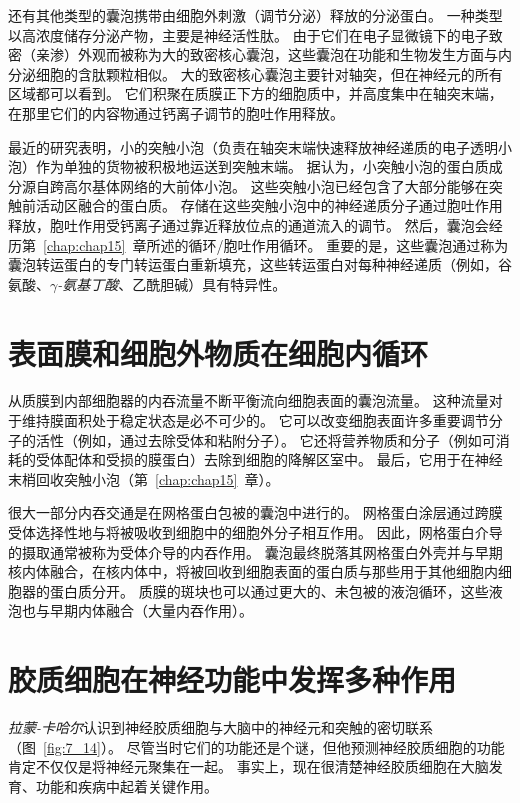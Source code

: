还有其他类型的囊泡携带由细胞外刺激（调节分泌）释放的分泌蛋白。
一种类型以高浓度储存分泌产物，主要是神经活性肽。
由于它们在电子显微镜下的电子致密（亲渗）外观而被称为大的致密核心囊泡，这些囊泡在功能和生物发生方面与内分泌细胞的含肽颗粒相似。
大的致密核心囊泡主要针对轴突，但在神经元的所有区域都可以看到。
它们积聚在质膜正下方的细胞质中，并高度集中在轴突末端，在那里它们的内容物通过钙离子调节的胞吐作用释放。


最近的研究表明，小的突触小泡（负责在轴突末端快速释放神经递质的电子透明小泡）作为单独的货物被积极地运送到突触末端。
据认为，小突触小泡的蛋白质成分源自跨高尔基体网络的大前体小泡。
这些突触小泡已经包含了大部分能够在突触前活动区融合的蛋白质。
存储在这些突触小泡中的神经递质分子通过胞吐作用释放，胞吐作用受钙离子通过靠近释放位点的通道流入的调节。
然后，囊泡会经历第~\ref{chap:chap15}~章所述的循环/胞吐作用循环。
重要的是，这些囊泡通过称为囊泡转运蛋白的专门转运蛋白重新填充，这些转运蛋白对每种神经递质（例如，谷氨酸、\textit{$\gamma$-氨基丁酸}、乙酰胆碱）具有特异性。



\section{表面膜和细胞外物质在细胞内循环}

从质膜到内部细胞器的内吞流量不断平衡流向细胞表面的囊泡流量。
这种流量对于维持膜面积处于稳定状态是必不可少的。
它可以改变细胞表面许多重要调节分子的活性（例如，通过去除受体和粘附分子）。
它还将营养物质和分子（例如可消耗的受体配体和受损的膜蛋白）去除到细胞的降解区室中。
最后，它用于在神经末梢回收突触小泡（第~\ref{chap:chap15}~章）。


很大一部分内吞交通是在网格蛋白包被的囊泡中进行的。 
网格蛋白涂层通过跨膜受体选择性地与将被吸收到细胞中的细胞外分子相互作用。
因此，网格蛋白介导的摄取通常被称为受体介导的内吞作用。
囊泡最终脱落其网格蛋白外壳并与早期核内体融合，在核内体中，将被回收到细胞表面的蛋白质与那些用于其他细胞内细胞器的蛋白质分开。
质膜的斑块也可以通过更大的、未包被的液泡循环，这些液泡也与早期内体融合（大量内吞作用）。



\section{胶质细胞在神经功能中发挥多种作用}

\textit{拉蒙-卡哈尔}认识到神经胶质细胞与大脑中的神经元和突触的密切联系（图~\ref{fig:7_14}）。
尽管当时它们的功能还是个谜，但他预测神经胶质细胞的功能肯定不仅仅是将神经元聚集在一起。
事实上，现在很清楚神经胶质细胞在大脑发育、功能和疾病中起着关键作用。


